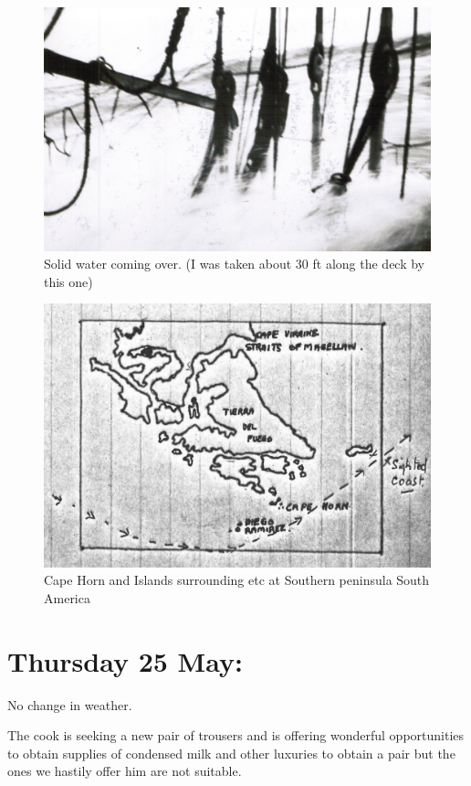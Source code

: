 \documentclass[
  11pt,
  msmallroyalvopaper
]{memoir}
\begin{document}
\begin{figure}
\centering
\includegraphics{./images/image014.png}
\caption{Solid water coming over. (I was taken about 30 ft along the
deck by this one)}
\end{figure}

\begin{figure}
\centering
\includegraphics{./images/cape-horn.png}
\caption{Cape Horn and Islands surrounding etc at Southern peninsula
South America}
\end{figure}

\hypertarget{thursday-25-may}{%
\section{Thursday 25 May:}\label{thursday-25-may}}

No change in weather.

The cook is seeking a new pair of trousers and is offering wonderful
opportunities to obtain supplies of condensed milk and other luxuries to
obtain a pair but the ones we hastily offer him are not suitable.
\end{document}
